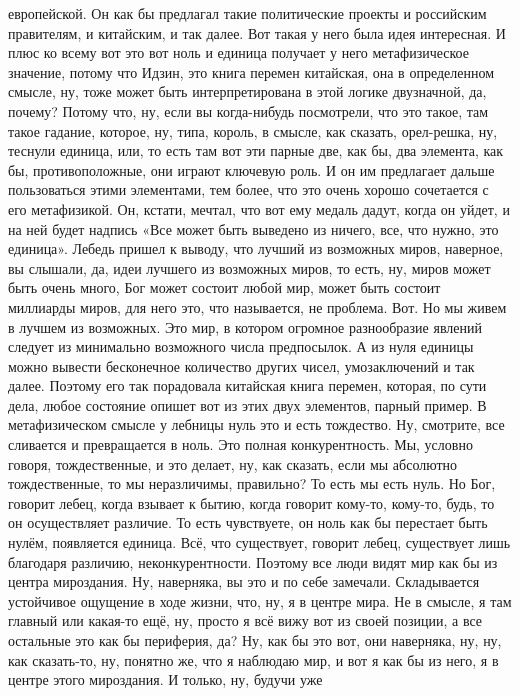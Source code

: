 европейской. Он как бы предлагал такие политические проекты и российским
правителям, и китайским, и так далее. Вот такая у него была идея интересная. И
плюс ко всему вот это вот ноль и единица получает у него метафизическое
значение, потому что Идзин, это книга перемен китайская, она в определенном
смысле, ну, тоже может быть интерпретирована в этой логике двузначной, да,
почему? Потому что, ну, если вы когда-нибудь посмотрели, что это такое, там
такое гадание, которое, ну, типа, король, в смысле, как сказать, орел-решка, ну,
теснули единица, или, то есть там вот эти парные две, как бы, два элемента, как
бы, противоположные, они играют ключевую роль. И он им предлагает дальше
пользоваться этими элементами, тем более, что это очень хорошо сочетается с его
метафизикой. Он, кстати, мечтал, что вот ему медаль дадут, когда он уйдет, и на
ней будет надпись «Все может быть выведено из ничего, все, что нужно, это
единица». Лебедь пришел к выводу, что лучший из возможных миров, наверное, вы
слышали, да, идеи лучшего из возможных миров, то есть, ну, миров может быть
очень много, Бог может состоит любой мир, может быть состоит миллиарды миров,
для него это, что называется, не проблема. Вот. Но мы живем в лучшем из
возможных. Это мир, в котором огромное разнообразие явлений следует из
минимально возможного числа предпосылок. А из нуля единицы можно вывести
бесконечное количество других чисел, умозаключений и так далее. Поэтому его так
порадовала китайская книга перемен, которая, по сути дела, любое состояние
опишет вот из этих двух элементов, парный пример. В метафизическом смысле у
лебницы нуль это и есть тождество. Ну, смотрите, все сливается и превращается в
ноль. Это полная конкурентность. Мы, условно говоря, тождественные, и это
делает, ну, как сказать, если мы абсолютно тождественные, то мы неразличимы,
правильно? То есть мы есть нуль. Но Бог, говорит лебец, когда взывает к бытию,
когда говорит кому-то, кому-то, будь, то он осуществляет различие. То есть
чувствуете, он ноль как бы перестает быть нулём, появляется единица. Всё, что
существует, говорит лебец, существует лишь благодаря различию, неконкурентности.
Поэтому все люди видят мир как бы из центра мироздания. Ну, наверняка, вы это и
по себе замечали. Складывается устойчивое ощущение в ходе жизни, что, ну, я в
центре мира. Не в смысле, я там главный или какая-то ещё, ну, просто я всё вижу
вот из своей позиции, а все остальные это как бы периферия, да? Ну, как бы это
вот, они наверняка, ну, ну, как сказать-то, ну, понятно же, что я наблюдаю мир,
и вот я как бы из него, я в центре этого мироздания. И только, ну, будучи уже
